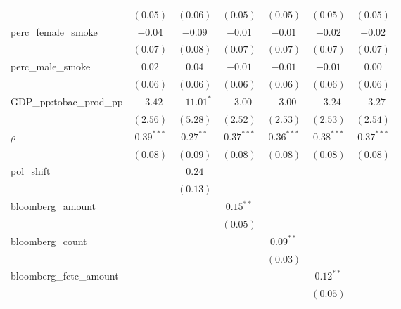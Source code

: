 \begin{table}[!h]
\begin{center}
\begin{tabular}{l c c c c c c }
                        & $(0.05)$     & $(0.06)$     & $(0.05)$     & $(0.05)$     & $(0.05)$     & $(0.05)$     \\
perc\_female\_smoke     & $-0.04$      & $-0.09$      & $-0.01$      & $-0.01$      & $-0.02$      & $-0.02$      \\
                        & $(0.07)$     & $(0.08)$     & $(0.07)$     & $(0.07)$     & $(0.07)$     & $(0.07)$     \\
perc\_male\_smoke       & $0.02$       & $0.04$       & $-0.01$      & $-0.01$      & $-0.01$      & $0.00$       \\
                        & $(0.06)$     & $(0.06)$     & $(0.06)$     & $(0.06)$     & $(0.06)$     & $(0.06)$     \\
GDP\_pp:tobac\_prod\_pp & $-3.42$      & $-11.01^{*}$ & $-3.00$      & $-3.00$      & $-3.24$      & $-3.27$      \\
                        & $(2.56)$     & $(5.28)$     & $(2.52)$     & $(2.53)$     & $(2.53)$     & $(2.54)$     \\
$\rho$                  & $0.39^{***}$ & $0.27^{**}$  & $0.37^{***}$ & $0.36^{***}$ & $0.38^{***}$ & $0.37^{***}$ \\
                        & $(0.08)$     & $(0.09)$     & $(0.08)$     & $(0.08)$     & $(0.08)$     & $(0.08)$     \\
pol\_shift              &              & $0.24$       &              &              &              &              \\
                        &              & $(0.13)$     &              &              &              &              \\
bloomberg\_amount       &              &              & $0.15^{**}$  &              &              &              \\
                        &              &              & $(0.05)$     &              &              &              \\
bloomberg\_count        &              &              &              & $0.09^{**}$  &              &              \\
                        &              &              &              & $(0.03)$     &              &              \\
bloomberg\_fctc\_amount &              &              &              &              & $0.12^{**}$  &              \\
                        &              &              &              &              & $(0.05)$     &              \\

\end{tabular}
\end{center}
\end{table}
